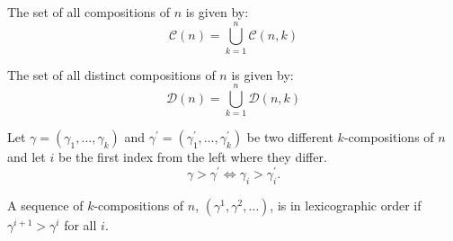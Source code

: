 \begin{definition}
    The set of all compositions of $n$ is given by:
    \[
        \mathcal{C}(n) = \bigcup_{k = 1}^{n} \mathcal{C}(n, k)
    \]
\end{definition}

\begin{definition}
    The set of all distinct compositions of $n$ is given by:
    \[
        \mathcal{D}(n) = \bigcup_{k = 1}^{n} \mathcal{D}(n, k)
    \]
\end{definition}

\begin{definition}
    Let $\gamma = (\gamma_1, \dots, \gamma_k)$ and $\gamma^{\prime} = (\gamma^{\prime}_1, \dots, \gamma^{\prime}_k)$ be two different $k$-compositions of $n$ and let $i$ be the first index from the left where they differ.
    \[
        \gamma > \gamma^{\prime} \iff \gamma_i > \gamma^{\prime}_i.
    \]
\end{definition}

\begin{definition}
    A sequence of $k$-compositions of $n$, $(\gamma^1, \gamma^2, \dots)$, is in lexicographic order if $\gamma^{i + 1} > \gamma^i$ for all $i$.
\end{definition}
